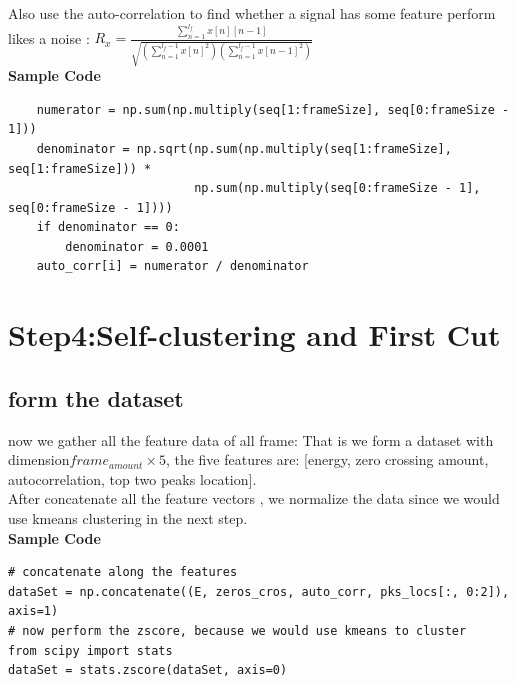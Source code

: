 \documentclass[twoside]{article}
\begin{document}
Also use the auto-correlation to find whether a signal has some feature perform likes a noise : $R_x =  \frac{\displaystyle \sum_{n=1}^{l_f} x[n][n-1]}{\sqrt{(\displaystyle \sum_{n=1}^{l_f-1}x[n]^2)(\displaystyle \sum_{n=1}^{l_f-1}x[n-1]^2)}}$\\

\textbf{Sample Code}
\begin{lstlisting}
    numerator = np.sum(np.multiply(seq[1:frameSize], seq[0:frameSize - 1]))
    denominator = np.sqrt(np.sum(np.multiply(seq[1:frameSize], seq[1:frameSize])) *
                          np.sum(np.multiply(seq[0:frameSize - 1], seq[0:frameSize - 1])))
    if denominator == 0:
        denominator = 0.0001
    auto_corr[i] = numerator / denominator
\end{lstlisting}

\section{Step4:Self-clustering and First Cut}
\subsection{form the dataset}
now we gather all the feature data of all frame: That is we form a dataset with dimension$frame_{amount} \times 5$, the five features are: [energy, zero crossing amount, autocorrelation, top two peaks location].\\
After concatenate all the feature vectors , we normalize the data since we would use kmeans clustering in the next step.\\
\textbf{Sample Code}
\begin{lstlisting}
# concatenate along the features
dataSet = np.concatenate((E, zeros_cros, auto_corr, pks_locs[:, 0:2]), axis=1)
# now perform the zscore, because we would use kmeans to cluster
from scipy import stats
dataSet = stats.zscore(dataSet, axis=0)
\end{lstlisting}
\end{document}
